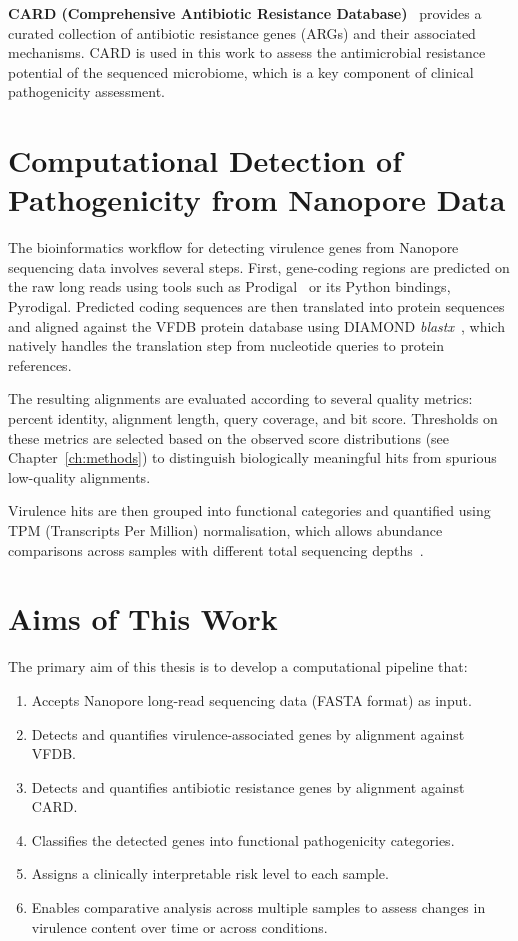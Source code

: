 \textbf{CARD (Comprehensive Antibiotic Resistance Database)}~\cite{TODO_CARD_citation}
provides a curated collection of antibiotic resistance genes (ARGs) and their
associated mechanisms. CARD is used in this work to assess the antimicrobial
resistance potential of the sequenced microbiome, which is a key component of
clinical pathogenicity assessment.

\section{Computational Detection of Pathogenicity from Nanopore Data}

The bioinformatics workflow for detecting virulence genes from Nanopore sequencing
data involves several steps. First, gene-coding regions are predicted on the raw
long reads using tools such as Prodigal~\cite{TODO_prodigal} or its Python
bindings, Pyrodigal. Predicted coding sequences are then translated into protein
sequences and aligned against the VFDB protein database using DIAMOND
\textit{blastx}~\cite{TODO_diamond}, which natively handles the translation step
from nucleotide queries to protein references.

The resulting alignments are evaluated according to several quality metrics:
percent identity, alignment length, query coverage, and bit score. Thresholds on
these metrics are selected based on the observed score distributions (see
Chapter~\ref{ch:methods}) to distinguish biologically meaningful hits from
spurious low-quality alignments.

Virulence hits are then grouped into functional categories and quantified using
TPM (Transcripts Per Million) normalisation, which allows abundance comparisons
across samples with different total sequencing depths~\cite{TODO_TPM}.

\section{Aims of This Work}

The primary aim of this thesis is to develop a computational pipeline that:

\begin{enumerate}
    \item Accepts Nanopore long-read sequencing data (FASTA format) as input.
    \item Detects and quantifies virulence-associated genes by alignment against VFDB.
    \item Detects and quantifies antibiotic resistance genes by alignment against CARD.
    \item Classifies the detected genes into functional pathogenicity categories.
    \item Assigns a clinically interpretable risk level to each sample.
    \item Enables comparative analysis across multiple samples to assess changes in
          virulence content over time or across conditions.
\end{enumerate}

